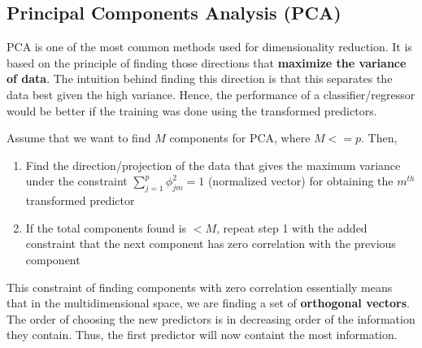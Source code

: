 \documentclass[../statistical_learning_notes.tex]{subfiles}
\begin{document}
    \subsection{Principal Components Analysis (PCA)}
    PCA is one of the most common methods used for dimensionality reduction. It is based on the principle of finding those directions that \textbf{maximize the variance of data}. The intuition behind finding this direction is that this separates the data best given the high variance. Hence, the performance of a classifier/regressor would be better if the training was done using the transformed predictors. \newline

    Assume that we want to find $M$ components for PCA, where $M <= p$. Then,
    \begin{enumerate}
        \item Find the direction/projection of the data that gives the maximum variance under the constraint $\sum_{j=1}^{p}\phi_{jm}^{2} = 1$ (normalized vector) for obtaining the $m^{th}$ transformed predictor
        \item If the total components found is $< M$, repeat step 1 with the added constraint that the next component has zero correlation with the previous component
    \end{enumerate}
    This constraint of finding components with zero correlation essentially means that in the multidimensional space, we are finding a set of \textbf{orthogonal vectors}. The order of choosing the new predictors is in decreasing order of the information they contain. Thus, the first predictor will now containt the most information. \newline

\end{document}

